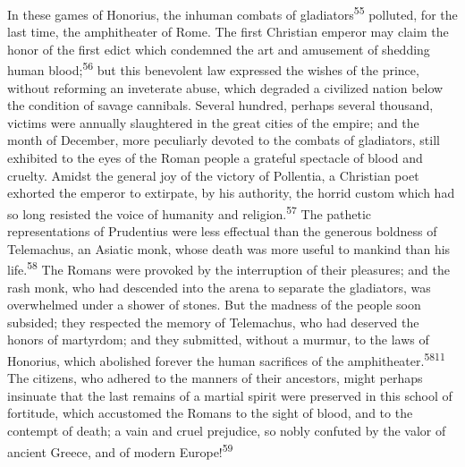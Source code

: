 In these games of Honorius, the inhuman combats of gladiators\textsuperscript{55}
polluted, for the last time, the amphitheater of Rome. The first
Christian emperor may claim the honor of the first edict which
condemned the art and amusement of shedding human blood;\textsuperscript{56} but
this benevolent law expressed the wishes of the prince, without
reforming an inveterate abuse, which degraded a civilized nation
below the condition of savage cannibals. Several hundred, perhaps
several thousand, victims were annually slaughtered in the great
cities of the empire; and the month of December, more peculiarly
devoted to the combats of gladiators, still exhibited to the eyes
of the Roman people a grateful spectacle of blood and cruelty.
Amidst the general joy of the victory of Pollentia, a Christian
poet exhorted the emperor to extirpate, by his authority, the
horrid custom which had so long resisted the voice of humanity
and religion.\textsuperscript{57} The pathetic representations of Prudentius were
less effectual than the generous boldness of Telemachus, an
Asiatic monk, whose death was more useful to mankind than his
life.\textsuperscript{58} The Romans were provoked by the interruption of their
pleasures; and the rash monk, who had descended into the arena to
separate the gladiators, was overwhelmed under a shower of
stones. But the madness of the people soon subsided; they
respected the memory of Telemachus, who had deserved the honors
of martyrdom; and they submitted, without a murmur, to the laws
of Honorius, which abolished forever the human sacrifices of the
amphitheater.\textsuperscript{5811} The citizens, who adhered to the manners of
their ancestors, might perhaps insinuate that the last remains of
a martial spirit were preserved in this school of fortitude,
which accustomed the Romans to the sight of blood, and to the
contempt of death; a vain and cruel prejudice, so nobly confuted
by the valor of ancient Greece, and of modern Europe!\textsuperscript{59}




